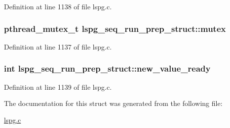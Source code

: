 Definition at line 1138 of file lspg.\-c.

\hypertarget{structlspg__seq__run__prep__struct_ad146cb91b5f7dd8bb283092c28781fe7}{
\subsubsection[{mutex}]{\setlength{\rightskip}{0pt plus 5cm}pthread\-\_\-mutex\-\_\-t lspg\-\_\-seq\-\_\-run\-\_\-prep\-\_\-struct\-::mutex}}\label{structlspg__seq__run__prep__struct_ad146cb91b5f7dd8bb283092c28781fe7}


Definition at line 1137 of file lspg.\-c.

\hypertarget{structlspg__seq__run__prep__struct_a42d08888327e9059ddd69ddfec31b8a9}{
\subsubsection[{new\-\_\-value\-\_\-ready}]{\setlength{\rightskip}{0pt plus 5cm}int lspg\-\_\-seq\-\_\-run\-\_\-prep\-\_\-struct\-::new\-\_\-value\-\_\-ready}}\label{structlspg__seq__run__prep__struct_a42d08888327e9059ddd69ddfec31b8a9}


Definition at line 1139 of file lspg.\-c.



The documentation for this struct was generated from the following file\-:\begin{DoxyCompactItemize}
\item 
\hyperlink{lspg_8c}{lspg.\-c}\end{DoxyCompactItemize}

